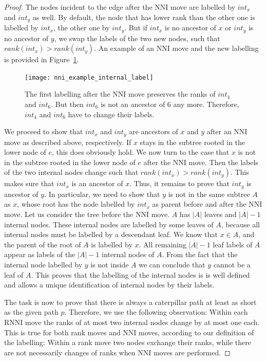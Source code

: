 \documentclass[11pt, a4paper]{article}
\newcommand{\nni}{\mathrm{NNI}}
\newcommand{\rnni}{\mathrm{RNNI}}
\begin{document}
\begin{proof}
	The nodes incident to the edge after the $\nni$ move are labelled by $int_x$ and $int_y$ as well.
	By default, the node that has lower rank than the other one is labelled by $int_x$, the other one by $int_y$.
	But if $int_x$ is no ancestor of $x$ or $int_y$ is no ancestor of $y$, we swap the labels of the two new nodes, such that $rank(int_x) > rank(int_y)$.
	An example of an $\nni$ move and the new labelling is provided in Figure~\ref{fig:nni_example_internal_label}.

	\begin{figure}[H]
		\centering
		\texttt{[image: nni\_example\_internal\_label]}
		\caption{The first labelling after the $\nni$ move preserves the ranks of $int_4$ and $int_6$.
		But then $int_6$ is not an ancestor of $6$ any more.
		Therefore, $int_4$ and $int_6$ have to change their labels.
		}
		\label{fig:nni_example_internal_label}
	\end{figure}

	We proceed to show that $int_x$ and $int_y$ are ancestors of $x$ and $y$ after an $\nni$ move as described above, respectively.
	If $x$ stays in the subtree rooted in the lower node of $e$, this does obviously hold.
	We now turn to the case that $x$ is not in the subtree rooted in the lower node of $e$ after the $\nni$ move.
	Then the labels of the two internal nodes change such that $rank(int_x) > rank(int_y)$.
	This makes sure that $int_x$ is an ancestor of $x$.
	Thus, it remains to prove that $int_y$ is ancestor of $y$.
	In particular, we need to show that $y$ is not in the same subtree $A$ as $x$, whose root has the node labelled by $int_x$ as parent before and after the $\nni$ move.
	Let us consider the tree before the $\nni$ move.
	$A$ has $|A|$ leaves and $|A| - 1$ internal nodes.
	These internal nodes are labelled by some leaves of $A$, because all internal nodes must be labelled by a descendant leaf.
	We know that $x \in A$, and the parent of the root of $A$ is labelled by $x$.
	All remaining $|A|-1$ leaf labels of $A$ appear as labels of the $|A|-1$ internal nodes of $A$.
	From the fact that the internal node labelled by $y$ is not inside $A$ we can conclude that $y$ cannot be a leaf of $A$.
	This proves that the labelling of the internal nodes is is well defined and allows a unique identification of internal nodes by their labels.

	The task is now to prove that there is always a caterpillar path at least as short as the given path $p$.
	Therefore, we use the following observation:
	Within each $\rnni$ move the ranks of at most two internal nodes change by at most one each.
	This is true for both rank moves and $\nni$ moves, according to our definition of the labelling:
	Within a rank move two nodes exchange their ranks, while there are not necessarily changes of ranks when $\nni$ moves are performed.


\end{proof}
\end{document}
